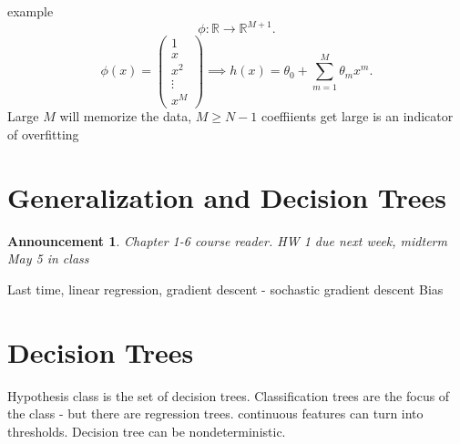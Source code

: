 \documentclass[a4paper,12pt]{scrartcl} %
\theoremstyle{darktheorem}
\newtheorem{announcement}[theorem]{Announcement}
\begin{document}
example
\[
\phi: \mathbb{R} \rightarrow \mathbb{R}^{M+1}
.\] 
\[
\phi(x) = \begin{pmatrix} 1 \\ x \\ x^2 \\ \vdots \\ x^{M} \end{pmatrix} \implies h(x) = \theta_0 + \sum_{m=1}^{M}\theta_mx^{m}
.\] 
Large $M$ will memorize the data, $M \ge N-1$ 
coeffiients get large is an indicator of overfitting
\section{Generalization and Decision Trees}
\begin{announcement}
    Chapter 1-6 course reader. HW 1 due next week, midterm May 5 in class
\end{announcement}
Last time, linear regression, gradient descent - sochastic gradient descent
Bias

\section{Decision Trees}
Hypothesis class is the set of decision trees.
Classification trees are the focus of the class - but there are regression trees.
continuous features can turn into thresholds. Decision tree can be nondeterministic.
\end{document}
